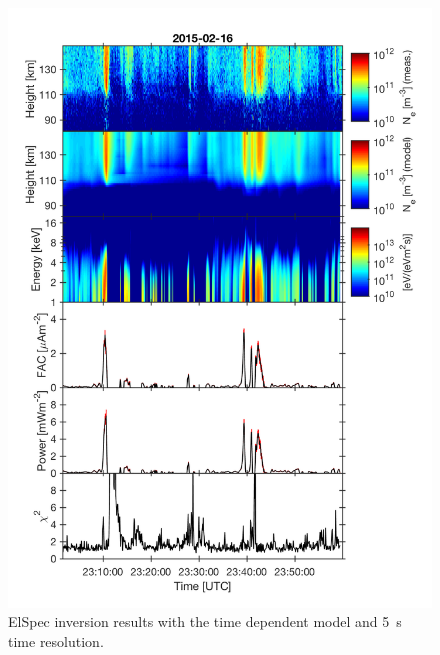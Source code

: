 \documentclass[12pt,a4paper]{report}
\begin{document}
\begin{figure}[ht]
\begin{center}
\includegraphics[width=\textwidth]{ElSpec_20150216T230135-20150216T235955_beata_uhf_Fang_SheehanGr_integrate_6_1_dump.png}
\caption{ElSpec inversion results with the time dependent model and 5~s time resolution. }
\label{figElSpecOut}
\end{center}
\end{figure}
\end{document}
